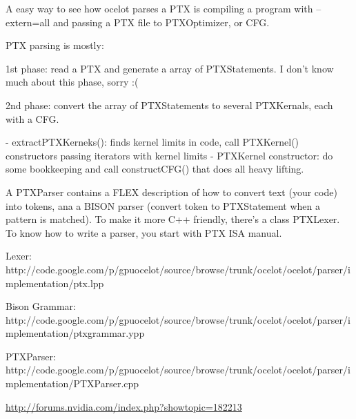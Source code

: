 A easy way to see how ocelot parses a PTX is compiling a program with
--extern=all and passing a PTX file to PTXOptimizer, or CFG.

PTX parsing is mostly:

1st phase: read a PTX and generate a array of PTXStatements. I don't know much about this phase, sorry :(

2nd phase: convert the array of PTXStatements to several PTXKernals, each with a CFG.

- extractPTXKerneks(): finds kernel limits in code, call PTXKernel() constructors passing iterators with kernel limits
- PTXKernel constructor: do some bookkeeping and call constructCFG() that does all heavy lifting. 

A PTXParser contains a FLEX description of how to convert text (your code) into
tokens, ana a BISON parser (convert token to PTXStatement when a pattern is
matched). To make it more C++ friendly, there's a class PTXLexer. To know how to
write a parser, you start with PTX ISA manual. 

Lexer:
http://code.google.com/p/gpuocelot/source/browse/trunk/ocelot/ocelot/parser/implementation/ptx.lpp

Bison Grammar:
http://code.google.com/p/gpuocelot/source/browse/trunk/ocelot/ocelot/parser/implementation/ptxgrammar.ypp

PTXParser:
http://code.google.com/p/gpuocelot/source/browse/trunk/ocelot/ocelot/parser/implementation/PTXParser.cpp


\url{http://forums.nvidia.com/index.php?showtopic=182213}


